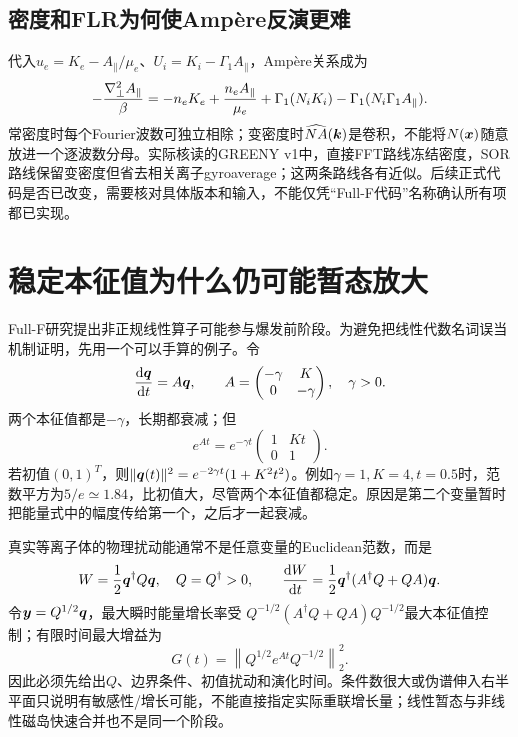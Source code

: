 \documentclass[UTF8,a4paper,11pt,openany,fontset=fandol]{ctexbook}
\begin{document}
\subsection{密度和FLR为何使Ampère反演更难}
代入$u_e=K_e-A_\parallel/\mu_e$、$U_i=K_i-\Gamma_1A_\parallel$，Ampère关系成为
\begin{equation}
 -{\nabla_\perp^2 A_\parallel\over\beta}
 =-n_eK_e+{n_eA_\parallel\over\mu_e}
   +\Gamma_1(N_iK_i)-\Gamma_1(N_i\Gamma_1A_\parallel).
\end{equation}
常密度时每个Fourier波数可独立相除；变密度时$\widehat{NA}(\bm{k})$是卷积，不能将$N(\bm{x})$随意放进一个逐波数分母。实际核读的GREENY v1中，直接FFT路线冻结密度，SOR路线保留变密度但省去相关离子gyroaverage；这两条路线各有近似。后续正式代码是否已改变，需要核对具体版本和输入，不能仅凭“Full-F代码”名称确认所有项都已实现\citep{E473}。

\section{稳定本征值为什么仍可能暂态放大}
\label{sec:remaining-nonnormal}
Full-F研究提出非正规线性算子可能参与爆发前阶段\citep{L314}。为避免把线性代数名词误当机制证明，先用一个可以手算的例子。令
\begin{equation}
 {\mathrm d\bm{q}\over\mathrm dt}=A\bm{q},\qquad
 A=\begin{pmatrix}-\gamma&K\\0&-\gamma\end{pmatrix},\quad\gamma>0.
\end{equation}
两个本征值都是$-\gamma$，长期都衰减；但
\begin{equation}
 e^{At}=e^{-\gamma t}\begin{pmatrix}1&Kt\\0&1\end{pmatrix}.
\end{equation}
若初值$(0,1)^T$，则$\|\bm{q}(t)\|^2=e^{-2\gamma t}(1+K^2t^2)$。例如$\gamma=1,K=4,t=0.5$时，范数平方为$5/e\simeq1.84$，比初值大，尽管两个本征值都稳定。原因是第二个变量暂时把能量式中的幅度传给第一个，之后才一起衰减。

真实等离子体的物理扰动能通常不是任意变量的Euclidean范数，而是
\begin{equation}
 W={1\over2}\bm{q}^\dagger Q\bm{q},\quad Q=Q^\dagger>0,
 \qquad {\mathrm dW\over\mathrm dt}={1\over2}\bm{q}^\dagger(A^\dagger Q+QA)\bm{q}.
\end{equation}
令$\bm{y}=Q^{1/2}\bm{q}$，最大瞬时能量增长率受
$Q^{-1/2}(A^\dagger Q+QA)Q^{-1/2}$最大本征值控制；有限时间最大增益为
\begin{equation}
 G(t)=\left\|Q^{1/2}e^{At}Q^{-1/2}\right\|_2^2.
\end{equation}
因此必须先给出$Q$、边界条件、初值扰动和演化时间。条件数很大或伪谱伸入右半平面只说明有敏感性/增长可能，不能直接指定实际重联增长量；线性暂态与非线性磁岛快速合并也不是同一个阶段。
\end{document}
